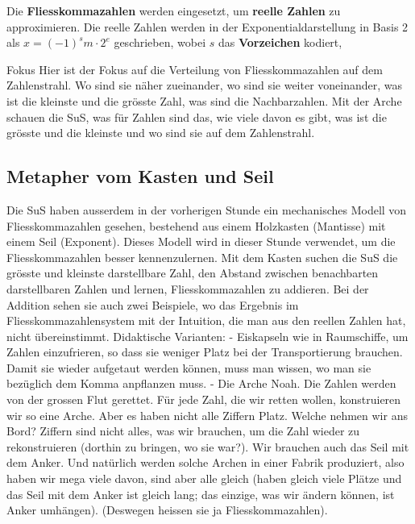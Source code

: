 \documentclass{article}
\begin{document}
Die \textbf{Fliesskommazahlen} werden eingesetzt, um \textbf{reelle Zahlen} zu approximieren. Die reelle Zahlen werden in der Exponentialdarstellung in Basis 2 als \(x = (-1)^s m \cdot 2^e\) geschrieben, wobei \(s\) das \textbf{Vorzeichen} kodiert,

Fokus
Hier ist der Fokus auf die Verteilung von Fliesskommazahlen auf dem Zahlenstrahl. Wo sind sie näher zueinander, wo sind sie weiter voneinander, was ist die kleinste und die grösste Zahl, was sind die Nachbarzahlen.
Mit der Arche schauen die SuS, was für Zahlen sind das, wie viele davon es gibt, was ist die grösste und die kleinste und wo sind sie auf dem Zahlenstrahl.

\subsection*{Metapher vom Kasten und Seil}

       Die SuS haben ausserdem in der vorherigen Stunde ein mechanisches Modell von Fliesskommazahlen gesehen, bestehend aus einem Holzkasten (Mantisse) mit einem Seil (Exponent).  Dieses Modell wird in dieser Stunde verwendet, um die Fliesskommazahlen besser kennenzulernen.
       Mit dem Kasten suchen die SuS die grösste und kleinste darstellbare Zahl, den Abstand zwischen benachbarten darstellbaren Zahlen und lernen, Fliesskommazahlen zu addieren. Bei der Addition sehen sie auch zwei Beispiele, wo das Ergebnis im Fliesskommazahlensystem mit der Intuition, die man aus den reellen Zahlen hat, nicht übereinstimmt.
Didaktische Varianten:
- Eiskapseln wie in Raumschiffe, um Zahlen einzufrieren, so dass sie weniger Platz bei der Transportierung brauchen. Damit sie wieder aufgetaut werden können, muss man wissen, wo man sie bezüglich dem Komma anpflanzen muss.
- Die Arche Noah. Die Zahlen werden von der grossen Flut gerettet. Für jede Zahl, die wir retten wollen, konstruieren wir so eine Arche. Aber es haben nicht alle Ziffern Platz. Welche nehmen wir ans Bord? Ziffern sind nicht alles, was wir brauchen, um die Zahl wieder zu rekonstruieren (dorthin zu bringen, wo sie war?). Wir brauchen auch das Seil mit dem Anker. Und natürlich werden solche Archen in einer Fabrik produziert, also haben wir mega viele davon, sind aber alle gleich (haben gleich viele Plätze und das Seil mit dem Anker ist gleich lang; das einzige, was wir ändern können, ist Anker umhängen). (Deswegen heissen sie ja Fliesskommazahlen).
\end{document}
